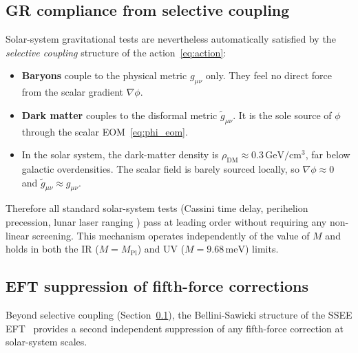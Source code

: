\documentclass[12pt,a4paper]{article}
\newcommand{\Mpl}{M_{\mathrm{Pl}}}
\begin{document}
\subsection{GR compliance from selective coupling}
\label{sec:gr_compliance}

Solar-system gravitational tests are nevertheless automatically satisfied by
the \emph{selective coupling} structure of the action~\eqref{eq:action}:
\begin{itemize}
  \item \textbf{Baryons} couple to the physical metric $g_{\mu\nu}$ only.
        They feel no direct force from the scalar gradient $\nabla\phi$.
  \item \textbf{Dark matter} couples to the disformal metric $\tilde{g}_{\mu\nu}$.
        It is the sole source of $\phi$ through the scalar EOM~\eqref{eq:phi_eom}.
  \item In the solar system, the dark-matter density is
        $\rho_{\mathrm{DM}} \approx 0.3\,\mathrm{GeV/cm^3}$, far below galactic
        overdensities. The scalar field is barely sourced locally, so
        $\nabla\phi \approx 0$ and $\tilde{g}_{\mu\nu} \approx g_{\mu\nu}$.
\end{itemize}
Therefore all standard solar-system tests (Cassini time delay, perihelion
precession, lunar laser ranging \citep{will2014}) pass at leading order without
requiring any non-linear screening.
This mechanism operates independently of the value of $M$ and holds in both the
IR ($M = \Mpl$) and UV ($M = 9.68\,\mathrm{meV}$) limits.

\subsection{EFT suppression of fifth-force corrections}
\label{sec:double_protection}

Beyond selective coupling (Section~\ref{sec:gr_compliance}), the Bellini-Sawicki
structure of the SSEE EFT~\citep{Bellini2015,ssee_paper7} provides a second
independent suppression of any fifth-force correction at solar-system scales.
\end{document}

